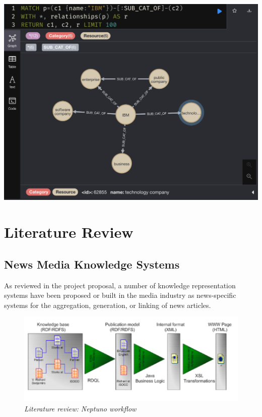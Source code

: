 \documentclass[11pt]{article}
\begin{document}
\begin{enumerate}
{    \centerline{\includegraphics[scale=0.3]{use-case-5b}}
    }
\end{enumerate}


\newpage


\section{Literature Review}

\label{sec:LiteratureReview}

  \subsection{News Media Knowledge Systems}

  As reviewed in the project proposal\cite{ek-proposal}, a number of knowledge representation systems have been proposed or built in the media industry as news-specific systems for the aggregation, generation, or linking of news articles. 

  \begin{figure}
    \centerline{\includegraphics[scale=0.4]{literature-review--neptuno.png}}
    \caption{\textit{Literature review: Neptuno workflow}}
  \end{figure}
\end{document}
